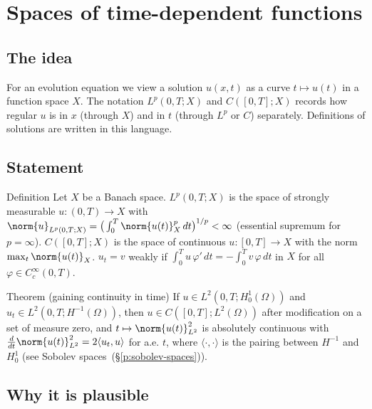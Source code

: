 
\section{Spaces of time-dependent functions}\label{p:bochner-spaces}


\subsection*{The idea}

For an evolution equation we view a solution $u(x,t)$ as a curve $t \mapsto u(t)$ in a function space $X$. The notation $L^p(0,T;X)$ and $C([0,T];X)$ records how regular $u$ is in $x$ (through $X$) and in $t$ (through $L^p$ or $C$) separately. Definitions of solutions are written in this language.

\subsection*{Statement}

\begin{defnbox}{Definition}
Let $X$ be a Banach space. $L^p(0,T;X)$ is the space of strongly measurable $u:(0,T)\to X$ with $\norm{u}_{L^p(0,T;X)} = \big(\int_0^T \norm{u(t)}_X^p\,dt\big)^{1/p} < \infty$ (essential supremum for $p=\infty$). $C([0,T];X)$ is the space of continuous $u:[0,T]\to X$ with the norm $\max_t \norm{u(t)}_X$. $u_t = v$ weakly if $\int_0^T u\,\varphi'\,dt = -\int_0^T v\,\varphi\,dt$ in $X$ for all $\varphi\in C_c^\infty(0,T)$.
\end{defnbox}

\begin{thmbox}{Theorem (gaining continuity in time)}
If $u \in L^2(0,T;H^1_0(\Omega))$ and $u_t \in L^2(0,T;H^{-1}(\Omega))$, then $u \in C([0,T];L^2(\Omega))$ after modification on a set of measure zero, and $t\mapsto\norm{u(t)}_{L^2}^2$ is absolutely continuous with $\frac{d}{dt}\norm{u(t)}_{L^2}^2 = 2\langle u_t, u\rangle$ for a.e. $t$, where $\langle\cdot,\cdot\rangle$ is the pairing between $H^{-1}$ and $H^1_0$ (see Sobolev spaces~(\S\ref{p:sobolev-spaces})).
\end{thmbox}

\subsection*{Why it is plausible}

